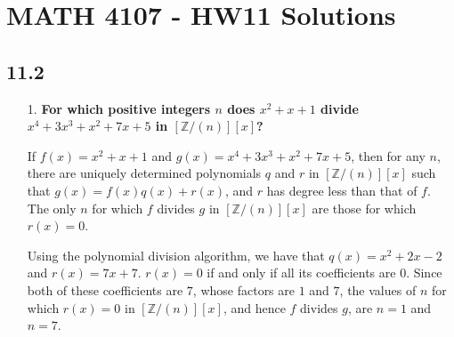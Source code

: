 \documentclass[a4paper,12pt]{article}
\begin{document}
\section*{MATH 4107 - HW11 Solutions}

\subsection*{11.2}
\begin{enumerate}
    \item[1.]
        \boldmath
        \textbf{For which positive integers $n$ does $x^2 + x + 1$ divide $x^4 + 3x^3 + x^2 + 7x + 5$ in $[\mathbb{Z}/(n)][x]$?} \par
        \unboldmath
        If $f(x) = x^2 + x + 1$ and $g(x) = x^4 + 3x^3 + x^2 + 7x + 5$, then for any $n$, there are uniquely determined polynomials $q$ and $r$ in $[\mathbb{Z}/(n)][x]$ such that $g(x) = f(x) q(x) + r(x)$, and $r$ has degree less than that of $f$. The only $n$ for which $f$ divides $g$ in $[\mathbb{Z}/(n)][x]$ are those for which $r(x) = 0$. \par
        Using the polynomial division algorithm, we have that $q(x) = x^2 + 2x - 2$ and $r(x) = 7x + 7$. $r(x) = 0$ if and only if all its coefficients are $0$. Since both of these coefficients are $7$, whose factors are $1$ and $7$, the values of $n$ for which $r(x) = 0$ in $[\mathbb{Z}/(n)][x]$, and hence $f$ divides $g$, are $n = 1$ and $n = 7$.
\end{enumerate}
\end{document}
